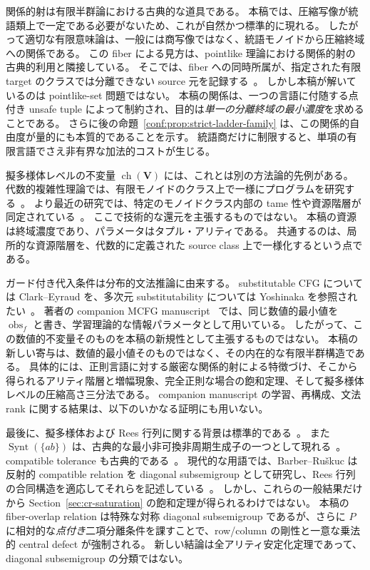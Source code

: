 \documentclass[10pt,a4paper]{ltjsarticle}
\theoremstyle{definition}
\theoremstyle{remark}
\newcommand{\obs}{\operatorname{obs}}
\begin{document}
関係的射は有限半群論における古典的な道具である。
本稿では、圧縮写像が統語類上で一定である必要がないため、これが自然かつ標準的に現れる。
したがって適切な有限意味論は、一般には商写像ではなく、統語モノイドから圧縮終域への関係である。
この fiber による見方は、pointlike 理論における関係的射の古典的利用と隣接している。
そこでは、fiber への同時所属が、指定された有限 target のクラスでは分離できない source 元を記録する~\cite{Almeida1994,RhodesSteinberg2009}。
しかし本稿が解いているのは pointlike-set 問題ではない。
本稿の関係は、一つの言語に付随する点付き unsafe tuple によって制約され、目的は\emph{単一の分離終域の最小濃度}を求めることである。
さらに後の命題~\ref{conf:prop:strict-ladder-family} は、この関係的自由度が量的にも本質的であることを示す。
統語商だけに制限すると、単項の有限言語でさえ非有界な加法的コストが生じる。

擬多様体レベルの不変量 $\operatorname{ch}(\mathbf V)$ には、これとは別の方法論的先例がある。
代数的複雑性理論では、有限モノイドのクラス上で一様にプログラムを研究する~\cite{BarringtonTherien1988}。
より最近の研究では、特定のモノイドクラス内部の tame 性や資源階層が同定されている~\cite{GrosshansMcKenzieSegoufin2017}。
ここで技術的な還元を主張するものではない。
本稿の資源は終域濃度であり、パラメータはタプル・アリティである。
共通するのは、局所的な資源階層を、代数的に定義された source class 上で一様化するという点である。

ガード付き代入条件は分布的文法推論に由来する。
substitutable CFG については Clark--Eyraud を、多次元 substitutability については Yoshinaka を参照されたい~\cite{ClarkEyraud2007,Yoshinaka2009,Yoshinaka2011}。
著者の companion MCFG manuscript~\cite{KuriyamaMCFG2026} では、同じ数値的最小値を $\obs_f$ と書き、学習理論的な情報パラメータとして用いている。
したがって、この数値的不変量そのものを本稿の新規性として主張するものではない。
本稿の新しい寄与は、数値的最小値そのものではなく、その内在的な有限半群構造である。
具体的には、正則言語に対する厳密な関係的射による特徴づけ、そこから得られるアリティ階層と増幅現象、完全正則な場合の飽和定理、そして擬多様体レベルの圧縮高さ三分法である。
companion manuscript の学習、再構成、文法 rank に関する結果は、以下のいかなる証明にも用いない。

最後に、擬多様体および Rees 行列に関する背景は標準的である~\cite{Pin1986,Almeida1994,RhodesSteinberg2009,Howie1995,Petrich1969,Petrich1974}。
また $\operatorname{Synt}(\{ab\})$ は、古典的な最小非可換非周期生成子の一つとして現れる~\cite{MargolisPin1984}。
compatible tolerance も古典的である~\cite{ZelinkaTolerance1975,Pondelicek1978,Loganathan1986,KumaresanTolerance1984}。
現代的な用語では、Barber--Ru\v{s}kuc は反射的 compatible relation を diagonal subsemigroup として研究し、Rees 行列の合同構造を適応してそれらを記述している~\cite{BarberRuskucDirectSquare,BarberRuskucDiagonal2026}。
しかし、これらの一般結果だけから Section~\ref{sec:cr-saturation} の飽和定理が得られるわけではない。
本稿の fiber-overlap relation は特殊な対称 diagonal subsemigroup であるが、さらに $P$ に相対的な\emph{点付き}二項分離条件を課すことで、row/column の剛性と一意な乗法的 central defect が強制される。
新しい結論は全アリティ安定化定理であって、diagonal subsemigroup の分類ではない。
\end{document}
